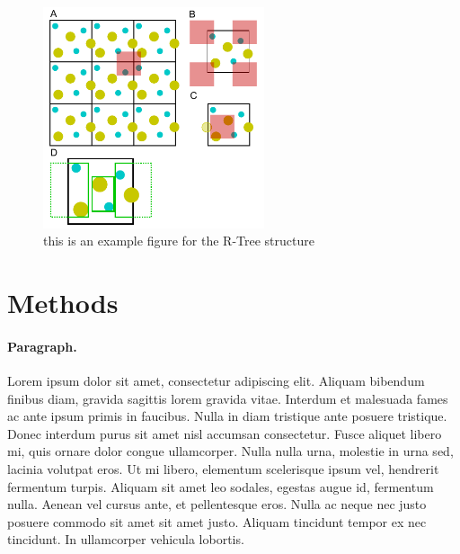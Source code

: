 \documentclass[10pt,letterpaper,twocolumn]{article}
\begin{document}
\begin{figure}[hbt]
    \includegraphics[width=6.5cm, bb=0 0 567 567]{fig1.eps}
    \caption{this is an example figure for the R-Tree structure}
    \label{fig1}
\end{figure}

\section*{Methods}

\paragraph{Paragraph.}
Lorem ipsum dolor sit amet, consectetur adipiscing elit. Aliquam bibendum
finibus diam, gravida sagittis lorem gravida vitae. Interdum et malesuada fames
ac ante ipsum primis in faucibus. Nulla in diam tristique ante posuere
tristique. Donec interdum purus sit amet nisl accumsan consectetur. Fusce
aliquet libero mi, quis ornare dolor congue ullamcorper. Nulla nulla urna,
molestie in urna sed, lacinia volutpat eros. Ut mi libero, elementum scelerisque
ipsum vel, hendrerit fermentum turpis. Aliquam sit amet leo sodales, egestas
augue id, fermentum nulla. Aenean vel cursus ante, et pellentesque eros. Nulla
ac neque nec justo posuere commodo sit amet sit amet justo. Aliquam tincidunt
tempor ex nec tincidunt. In ullamcorper vehicula lobortis.
\end{document}
